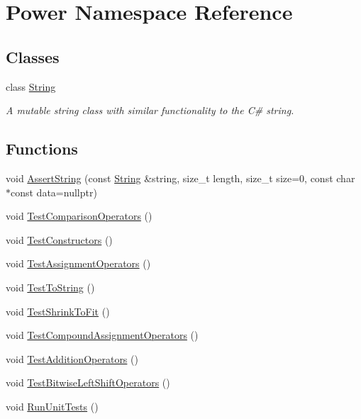 \hypertarget{namespace_power}{}\section{Power Namespace Reference}
\label{namespace_power}
\subsection*{Classes}
\begin{DoxyCompactItemize}
\item 
class \hyperlink{class_power_1_1_string}{String}
\begin{DoxyCompactList}\small\item\em A mutable string class with similar functionality to the C\# string. \end{DoxyCompactList}\end{DoxyCompactItemize}
\subsection*{Functions}
\begin{DoxyCompactItemize}
\item 
void \hyperlink{namespace_power_a94cb0120c19b1c711fcf5959130efc67}{Assert\+String} (const \hyperlink{class_power_1_1_string}{String} \&string, size\+\_\+t length, size\+\_\+t size=0, const char $\ast$const data=nullptr)
\item 
void \hyperlink{namespace_power_a93bc9ffcd35542cdc32911f0ab15240f}{Test\+Comparison\+Operators} ()
\item 
void \hyperlink{namespace_power_ac74fec7f3704b9c554276fa307de5bc5}{Test\+Constructors} ()
\item 
void \hyperlink{namespace_power_a1a76f10edba05c095268d242031d5544}{Test\+Assignment\+Operators} ()
\item 
void \hyperlink{namespace_power_a089aad37a74a89e886f605a3ea478664}{Test\+To\+String} ()
\item 
void \hyperlink{namespace_power_ae23123cd183d3656e9fcdb0ca4b54aab}{Test\+Shrink\+To\+Fit} ()
\item 
void \hyperlink{namespace_power_a9980a95021b19e68741111b8d706f60d}{Test\+Compound\+Assignment\+Operators} ()
\item 
void \hyperlink{namespace_power_af5fd85b391b910757cd55c237cfac27a}{Test\+Addition\+Operators} ()
\item 
void \hyperlink{namespace_power_a3d6dfcf89602f4aa5f6c078f41a9a194}{Test\+Bitwise\+Left\+Shift\+Operators} ()
\item 
void \hyperlink{namespace_power_a98ecb039bc50b27644cdee95dff097d3}{Run\+Unit\+Tests} ()
\end{DoxyCompactItemize}



